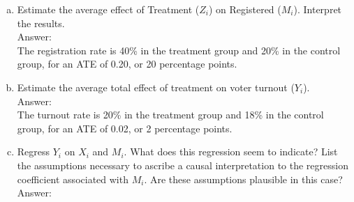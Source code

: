 \documentclass[11pt,notitlepage]{article}\usepackage[]{graphicx}\usepackage[]{color}
\begin{document}
\begin{enumerate}[a)]
\item Estimate the average effect of Treatment ($Z_i$) on Registered ($M_i$). Interpret the results. \\
Answer:\\
The registration rate is 40\% in the treatment group and 20\% in the control group, for an ATE of 0.20, or 20 percentage points.

\item Estimate the average total effect of treatment on voter turnout ($Y_i$).\\
Answer:\\
The turnout rate is 20\% in the treatment group and 18\% in the control group, for an ATE of 0.02, or 2 percentage points. 

\item Regress $Y_i$ on $X_i$ and $M_i$. What does this regression seem to indicate? List the assumptions necessary to ascribe a causal interpretation to the regression coefficient associated with $M_i$. Are these assumptions plausible in this case?\\
Answer:\\


\end{enumerate}
\end{document}

